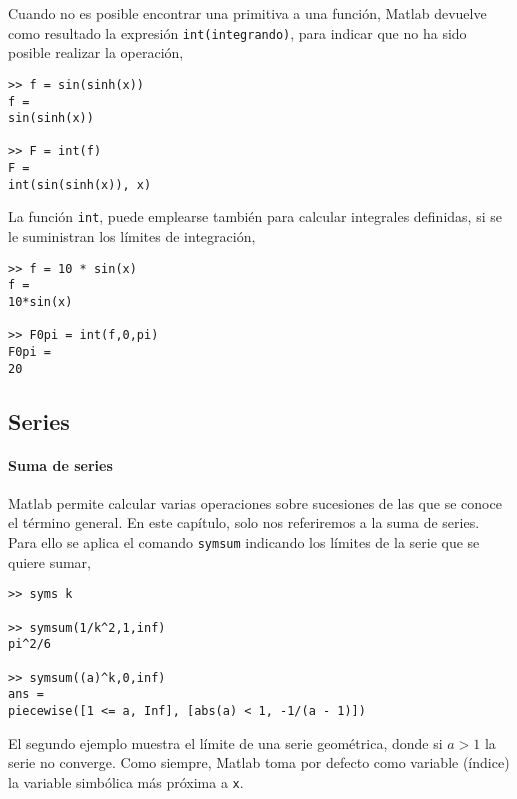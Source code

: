 Cuando no es posible encontrar una primitiva a una función, Matlab devuelve como resultado la expresión \texttt{int(integrando)}, para indicar que no ha sido posible realizar la operación,
\begin{verbatim}
>> f = sin(sinh(x)) 
f = 
sin(sinh(x))
 
>> F = int(f) 
F = 
int(sin(sinh(x)), x)
\end{verbatim}

La función \texttt{int}, puede emplearse también para calcular integrales definidas, si se le suministran los límites de integración,

\begin{verbatim}
>> f = 10 * sin(x) 
f = 
10*sin(x)
 
>> F0pi = int(f,0,pi) 
F0pi = 
20
\end{verbatim}

\subsection{Series} 

\paragraph{Suma de series}Matlab permite calcular varias operaciones sobre sucesiones de las que se conoce el término general. En este capítulo, solo nos referiremos a la suma de series. 
Para ello se aplica el comando \texttt{symsum} indicando los límites de la serie que se quiere sumar,

\begin{verbatim}
>> syms k

>> symsum(1/k^2,1,inf)
pi^2/6

>> symsum((a)^k,0,inf)
ans =
piecewise([1 <= a, Inf], [abs(a) < 1, -1/(a - 1)])
\end{verbatim}
El segundo ejemplo muestra el límite de una serie geométrica, donde si $a>1$ la serie no converge. Como siempre, Matlab toma por defecto como variable (índice) la variable simbólica más próxima a \texttt{x}.

